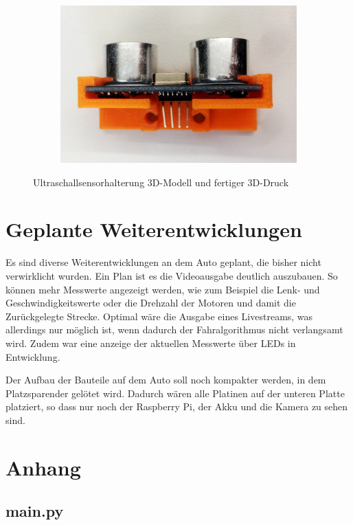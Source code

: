\documentclass[a4paper, 12pt]{scrartcl}
\begin{document}
\begin{figure}[ht!]
\begin{subfigure}{.5\textwidth}
	\end{subfigure}%
	\begin{subfigure}{.5\textwidth} \centering
		\includegraphics[width=\textwidth]{../bilder_videos/Sensorhalterung_Top.png}
	\end{subfigure}%
	\caption{Ultraschallsensorhalterung 3D-Modell und fertiger 3D-Druck}
\end{figure}

\newpage
\section{Geplante Weiterentwicklungen}

Es sind diverse Weiterentwicklungen an dem Auto geplant, die bisher nicht verwirklicht wurden.
Ein Plan ist es die Videoausgabe deutlich auszubauen. So können mehr Messwerte angezeigt werden, wie zum Beispiel die Lenk- und Geschwindigkeitswerte oder die Drehzahl der Motoren und damit die Zurückgelegte Strecke. Optimal wäre die Ausgabe eines Livestreams, was allerdings nur möglich ist, wenn dadurch der Fahralgorithmus nicht verlangsamt wird.
Zudem war eine anzeige der aktuellen Messwerte über LEDs in Entwicklung.

Der Aufbau der Bauteile auf dem Auto soll noch kompakter werden, in dem Platzsparender gelötet wird. Dadurch wären alle Platinen auf der unteren Platte platziert, so dass nur noch der Raspberry Pi, der Akku und die Kamera zu sehen sind.

\newpage
\section{Anhang}

\subsection{main.py}

\end{document}
